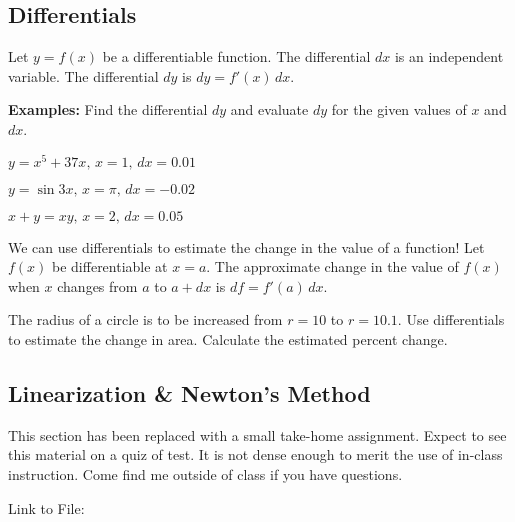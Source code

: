 \subsection*{Differentials}
\begin{tcolorbox}[title= DEFINITION OF A DIFFERENTIAL,colframe=black,sharp corners,colback=white,colbacktitle=white,coltitle=black,boxrule=1pt]

    Let $y=f(x)$ be a differentiable function. The differential $dx$ is an independent variable. The differential $dy$ is $dy=f'(x)\,dx$.
    
\end{tcolorbox}
\noindent\textbf{Examples:} Find the differential $dy$ and evaluate $dy$ for the given values of $x$ and $dx$.
\begin{questions}
    \question $y=x^5+37x,\,x=1,\,dx=0.01$
    
    \question $y=\sin3x,\,x=\pi,\,dx=-0.02$
    
    \question $x+y=xy,\,x=2,\,dx=0.05$
\end{questions}

We can use differentials to estimate the change in the value of a function! Let $f(x)$ be differentiable at $x=a$. The approximate change in the value of $f(x)$ when $x$ changes from $a$ to $a+dx$ is $df=f'(a)\,dx$.
\begin{questions}
    \setcounter{question}{3}
    \question The radius of a circle is to be increased from $r=10$ to $r=10.1$. Use differentials to estimate the change in area. Calculate the estimated percent change.
\end{questions}

\subsection*{Linearization \& Newton's Method}
This section has been replaced with a small take-home assignment. Expect to see this material on a quiz of test. It is not dense enough to merit the use of in-class instruction. Come find me outside of class if you have questions.

\begin{center}
    Link to File:
    
    \vspace{.2cm}
    
    
\end{center}



\newpage
